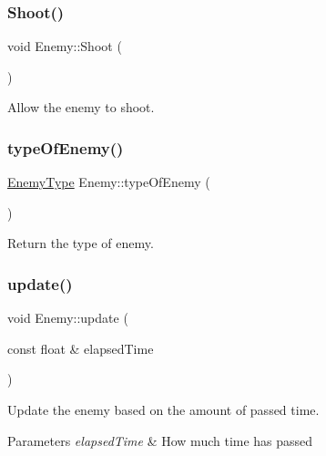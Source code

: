 \mbox{\label{class_enemy_ab526cfaf13910e15ca1e5e84ef230dd1}} 
\subsubsection{\texorpdfstring{Shoot()}{Shoot()}}
{\footnotesize\ttfamily void Enemy\+::\+Shoot (\begin{DoxyParamCaption}{ }\end{DoxyParamCaption})}



Allow the enemy to shoot. 

\mbox{\label{class_enemy_a7d8b3efe6d46b3c77446fe7f2a282a19}} 
\subsubsection{\texorpdfstring{type\+Of\+Enemy()}{typeOfEnemy()}}
{\footnotesize\ttfamily \hyperlink{_enemy_8h_ac3e413a86119db4b031458c7259e268e}{Enemy\+Type} Enemy\+::type\+Of\+Enemy (\begin{DoxyParamCaption}{ }\end{DoxyParamCaption})}



Return the type of enemy. 

\mbox{\label{class_enemy_a541b72a32e4a0217d58d1ee573c2f23a}} 
\subsubsection{\texorpdfstring{update()}{update()}}
{\footnotesize\ttfamily void Enemy\+::update (\begin{DoxyParamCaption}\item[{const float \&}]{elapsed\+Time }\end{DoxyParamCaption})}



Update the enemy based on the amount of passed time. 


\begin{DoxyParams}{Parameters}
{\em elapsed\+Time} & How much time has passed \\
\hline
\end{DoxyParams}
\mbox{\label{class_enemy_a85b0344388ba2e073bd610cf88025037}} 
